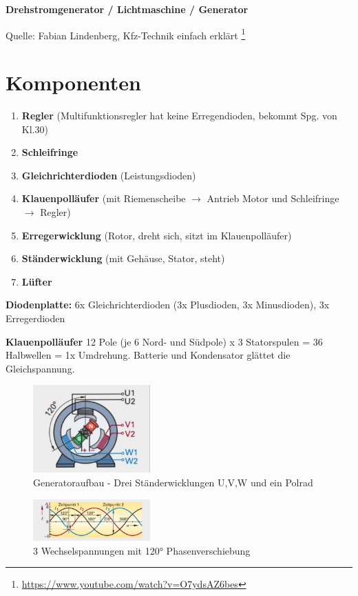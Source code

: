 \textbf{Drehstromgenerator / Lichtmaschine / Generator}

Quelle: Fabian Lindenberg, Kfz-Technik einfach erklärt \footnote{\url{https://www.youtube.com/watch?v=O7ydsAZ6bes}}

\section{Komponenten}\label{komponenten}

\begin{enumerate}
\item
  \textbf{Regler} (Multifunktionsregler hat keine Erregendioden, bekommt
  Spg. von Kl.30)
\item
  \textbf{Schleifringe}
\item
  \textbf{Gleichrichterdioden} (Leistungsdioden)
\item
  \textbf{Klauenpolläufer} (mit Riemenscheibe $\to$ Antrieb Motor und
  Schleifringe $\to$ Regler)
\item
  \textbf{Erregerwicklung} (Rotor, dreht sich, sitzt im Klauenpolläufer)
\item
  \textbf{Ständerwicklung} (mit Gehäuse, Stator, steht)
\item
  \textbf{Lüfter}
\end{enumerate}

\textbf{Diodenplatte:} 6x Gleichrichterdioden (3x Plusdioden, 3x
Minusdioden), 3x Erregerdioden

\textbf{Klauenpolläufer} 12 Pole (je 6 Nord- und Südpole) x 3
Statorspulen = 36 Halbwellen = 1x Umdrehung. Batterie und Kondensator
glättet die Gleichspannung.

\begin{figure}[!ht]%
\centering
\includegraphics[width=0.4\textwidth]{images/Generator/Generator-11.pdf}
\caption{Generatoraufbau - Drei Ständerwicklungen U,V,W und ein Polrad}
\end{figure}

\begin{figure}[!ht]%
\centering
\includegraphics[width=0.4\textwidth]{images/Generator/Generator-8.pdf}
\caption{3 Wechselspannungen mit 120° Phasenverschiebung}
\end{figure}


